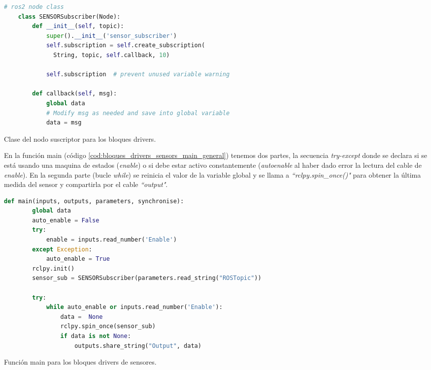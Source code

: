 \begin{code}[H]
  \begin{lstlisting}[language=python]
    # ros2 node class
    class SENSORSubscriber(Node):
        def __init__(self, topic):
            super().__init__('sensor_subscriber')
            self.subscription = self.create_subscription(
              String, topic, self.callback, 10)

            self.subscription  # prevent unused variable warning
    
        def callback(self, msg):
            global data
            # Modify msg as needed and save into global variable
            data = msg
  \end{lstlisting}
  \caption[Clase del nodo suscriptor para bloques drivers]{Clase del nodo suscriptor para los bloques drivers.}
  \label{cod:bloques_drivers_sensors_node_class}
\end{code}

En la función main (código \ref{cod:bloques_drivers_sensors_main_general}) tenemos dos partes, la secuencia \textit{try-except} donde se declara
si se está usando una maquina de estados (\textit{enable}) o si debe estar activo constantemente (\textit{autoenable} al haber dado error la lectura
del cable de \textit{enable}).
En la segunda parte (bucle \textit{while}) se reinicia el valor de la variable global y se llama a \textit{``rclpy.spin\_once()"} para obtener la
última medida del sensor y compartirla por el cable \textit{``output"}.

\begin{code}[H]
  \begin{lstlisting}[language=python]
    def main(inputs, outputs, parameters, synchronise):
        global data
        auto_enable = False
        try:
            enable = inputs.read_number('Enable')
        except Exception:
            auto_enable = True
        rclpy.init()
        sensor_sub = SENSORSubscriber(parameters.read_string("ROSTopic"))

        try:
            while auto_enable or inputs.read_number('Enable'):
                data =  None
                rclpy.spin_once(sensor_sub)
                if data is not None:
                    outputs.share_string("Output", data)
  \end{lstlisting}
  \caption[Función main para bloques drivers de sensores]{Función main para los bloques drivers de sensores.}
  \label{cod:bloques_drivers_sensors_main_general}
\end{code}

